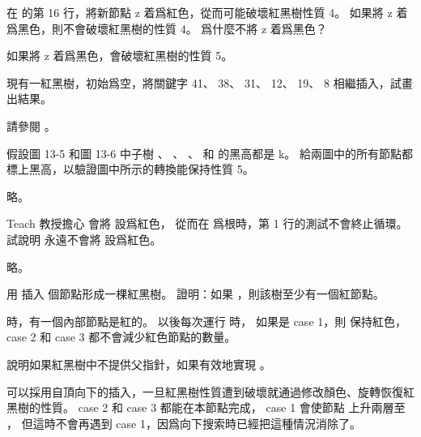 \startsection[
  title={Insertion},
]

\startEXERCISE
在  的第 16 行，將新節點 z 着爲紅色，從而可能破壞紅黑樹性質 4。
如果將 z 着爲黑色，則不會破壞紅黑樹的性質 4。
爲什麼不將 z 着爲黑色？
\stopEXERCISE

\startANSWER
如果將 z 着爲黑色，會破壞紅黑樹的性質 5。
\stopANSWER

\startEXERCISE
現有一紅黑樹，初始爲空，將關鍵字 41、 38、 31、 12、 19、 8 相繼插入，試畫出結果。
\stopEXERCISE

\startANSWER
請參閱 。

\externalfigure[output/e13_3_2-1]
\stopANSWER

\startEXERCISE
假設圖 13-5 和圖 13-6 中子樹 \m{\alpha}、 \m{\beta}、 \m{\gamma}、 \m{\delta} 和 \m{\epsilon} 的黑高都是 k。
給兩圖中的所有節點都標上黑高，以驗證圖中所示的轉換能保持性質 5。
\stopEXERCISE

\startANSWER
略。
\stopANSWER

\startEXERCISE
Teach 教授擔心  會將  設爲紅色，
從而在  爲根時，第 1 行的測試不會終止循環。
試說明  永遠不會將  設爲紅色。
\stopEXERCISE

\startANSWER
略。
\stopANSWER

\startEXERCISE
用  插入  個節點形成一棵紅黑樹。
證明：如果 ，則該樹至少有一個紅節點。
\stopEXERCISE

\startANSWER
{} 時，有一個內部節點是紅的。
以後每次運行  時，
如果是 case 1，則  保持紅色，case 2 和 case 3 都不會減少紅色節點的數量。
\stopANSWER

\startEXERCISE[exercise:13.3-6]
說明如果紅黑樹中不提供父指針，如果有效地實現 。
\stopEXERCISE

\startANSWER
可以採用自頂向下的插入，一旦紅黑樹性質遭到破壞就通過修改顏色、旋轉恢復紅黑樹的性質。
 case 2 和 case 3 都能在本節點完成，
 case 1 會使節點  上升兩層至 ，
但這時不會再遇到 case 1，因爲向下搜索時已經把這種情況消除了。
\stopANSWER

\stopsection
